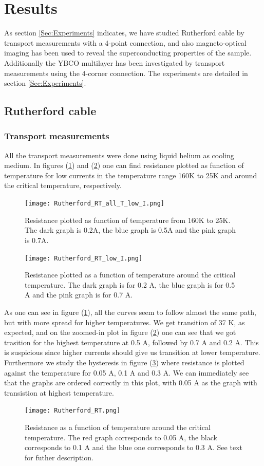 \documentclass{comjnl}
\begin{document}
\section{Results}\label{Sec:Results}
As section \ref{Sec:Experiments} indicates, we have studied Rutherford cable by transport measurements with a 4-point connection, and also magneto-optical imaging has been used to reveal the superconducting properties of the sample. Additionally the YBCO multilayer has been investigated by transport measurements using the 4-corner connection. The experiments are detailed in section \ref{Sec:Experiments}.

\subsection{Rutherford cable}
\subsubsection{Transport measurements}
All the transport measurements were done using liquid helium as cooling medium. In figures (\ref{fig:rutherfordRTallI}) and (\ref{fig:rutherfordRTlowI}) one can find resistance plotted as function of temperature for low currents in the temperature range 160K to 25K and around the critical temperature, respectively. 
\begin{figure}[h]
\centering
\texttt{[image: Rutherford\_RT\_all\_T\_low\_I.png]}
\caption{Resistance plotted as function of temperature from 160K to 25K. The dark graph is 0.2A, the blue graph is 0.5A and the pink graph is 0.7A. \label{fig:rutherfordRTallI}}
\end{figure}
\begin{figure}[h]
\centering
\texttt{[image: Rutherford\_RT\_low\_I.png]}
\caption{Resistance plotted as a function of temperature around the critical temperature. The dark graph is for 0.2 A, the blue graph is for 0.5 A and the pink graph is for 0.7 A. \label{fig:rutherfordRTlowI}}
\end{figure}
As one can see in figure (\ref{fig:rutherfordRTallI}), all the curves seem to follow almost the same path, but with more spread for higher temperatures. We get transition of 37 K, as expected, and on the zoomed-in plot in figure (\ref{fig:rutherfordRTlowI}) one can see that we got trasition for the highest temperature at 0.5 A, followed by 0.7 A and 0.2 A. This is suspicious since higher currents should give us transition at lower temperature. Furthermore we study the hysteresis in figure (\ref{fig:rutherfordRT}) where resistance is plotted against the temperature for 0.05 A, 0.1 A and 0.3 A. We can immediately see that the graphs are ordered correctly in this plot, with 0.05 A as the graph with transistion at highest temperature.
\begin{figure}[h]
\centering
\texttt{[image: Rutherford\_RT.png]}
\caption{Resistance as a function of temperature around the critical temperature. The red graph corresponds to 0.05 A, the black corresponds to 0.1 A and the blue one corresponds to 0.3 A. See text for futher description. \label{fig:rutherfordRT}}
\end{figure}
\end{document}
